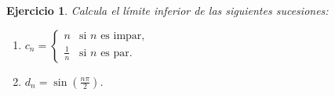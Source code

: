 \documentclass[11pt]{report}
\newtheorem{ex}{Ejercicio}
\begin{document}
\begin{ex}
  Calcula el límite inferior de las siguientes sucesiones:
  \begin{enumerate}
    \item \( c_n = \begin{cases}
      n & \text{si } n \text{ es impar}, \\
      \frac{1}{n} & \text{si } n \text{ es par}.
    \end{cases} \)
    \item \( d_n = \sin\left(\frac{n \pi}{2}\right) \).
  \end{enumerate}


\end{ex}
\end{document}
